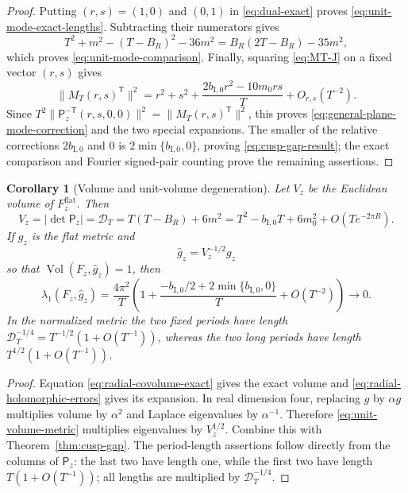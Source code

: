 \documentclass[11pt]{article}
\numberwithin{equation}{section}
\newtheorem{corollary}[theorem]{Corollary}
\theoremstyle{definition}
\theoremstyle{remark}
\begin{document}
\begin{proof}
Putting $(r,s)=(1,0)$ and $(0,1)$ in \eqref{eq:dual-exact} proves
\eqref{eq:unit-mode-exact-lengths}.  Subtracting their numerators gives
\[
 T^2+m^2-(T-B_R)^2-36m^2
 =B_R(2T-B_R)-35m^2,
\]
which proves \eqref{eq:unit-mode-comparison}.  Finally, squaring
\eqref{eq:MT-J} on a fixed vector $(r,s)$ gives
\[
 \|M_T(r,s)^{\mathsf T}\|^2
 =r^2+s^2+\frac{2b_{\mathrm I,0}r^2-10m_0rs}{T}+O_{r,s}(T^{-2}).
\]
Since $T^2\|\mathsf P_z^{-\mathsf T}(r,s,0,0)\|^2
=\|M_T(r,s)^{\mathsf T}\|^2$, this proves
\eqref{eq:general-plane-mode-correction} and the two special expansions.
The smaller of the relative corrections $2b_{\mathrm I,0}$ and $0$ is
$2\min\{b_{\mathrm I,0},0\}$, proving \eqref{eq:cusp-gap-result}; the exact comparison
and Fourier signed-pair counting prove the remaining assertions.
\end{proof}

\begin{corollary}[Volume and unit-volume degeneration]\label{cor:unit-volume}
Let $V_z$ be the Euclidean volume of $F_z^{\mathrm{flat}}$.  Then
\begin{equation}\label{eq:volume-asymptotic}
 V_z=|\det\mathsf P_z|=\mathcal D_T
 =T(T-B_R)+6m^2
 =T^2-b_{\mathrm I,0}T+6m_0^2+O(Te^{-2\pi R}).
\end{equation}
If $g_z$ is the flat metric and
\begin{equation}\label{eq:unit-volume-metric}
 \widehat g_z=V_z^{-1/2}g_z
\end{equation}
so that $\operatorname{Vol}(F_z,\widehat g_z)=1$, then
\begin{equation}\label{eq:unit-volume-gap}
 \lambda_1(F_z,\widehat g_z)
 =\frac{4\pi^2}{T}
 \left(1+\frac{-b_{\mathrm I,0}/2+2\min\{b_{\mathrm I,0},0\}}{T}
 +O(T^{-2})\right)\longrightarrow0.
\end{equation}
In the normalized metric the two fixed periods have length
$\mathcal D_T^{-1/4}=T^{-1/2}(1+O(T^{-1}))$, whereas the two long periods
have length $T^{1/2}(1+O(T^{-1}))$.
\end{corollary}

\begin{proof}
Equation \eqref{eq:radial-covolume-exact} gives the exact volume and
\eqref{eq:radial-holomorphic-errors} gives its expansion.  In real dimension
four, replacing $g$ by
$\alpha g$ multiplies volume by $\alpha^2$ and Laplace eigenvalues by
$\alpha^{-1}$.  Therefore \eqref{eq:unit-volume-metric} multiplies eigenvalues by $V_z^{1/2}$.  Combine this with Theorem~\ref{thm:cusp-gap}.
The period-length assertions follow directly from the columns of
$\mathsf P_z$: the last two have length one, while the first two have length
$T(1+O(T^{-1}))$; all lengths are multiplied by $\mathcal D_T^{-1/4}$.
\end{proof}
\end{document}
